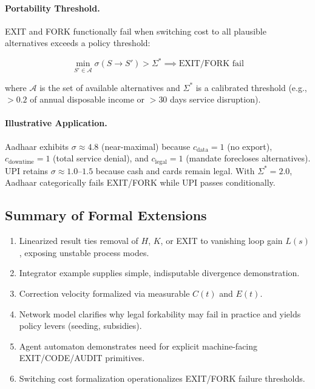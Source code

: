 \documentclass{article}
\begin{document}
\paragraph{Portability Threshold.} EXIT and FORK functionally fail when switching cost to all plausible alternatives exceeds a policy threshold:

\begin{equation}
\min_{S' \in \mathcal{A}} \sigma(S \to S') > \Sigma^* \implies \text{EXIT/FORK fail}
\label{eq:portability-threshold}
\end{equation}

where $\mathcal{A}$ is the set of available alternatives and $\Sigma^*$ is a calibrated threshold (e.g., $>0.2$ of annual disposable income or $>30$ days service disruption).

\paragraph{Illustrative Application.} Aadhaar exhibits $\sigma \approx 4.8$ (near-maximal) because $c_{\text{data}} = 1$ (no export), $c_{\text{downtime}} = 1$ (total service denial), and $c_{\text{legal}} = 1$ (mandate forecloses alternatives). UPI retains $\sigma \approx 1.0$--$1.5$ because cash and cards remain legal. With $\Sigma^* = 2.0$, Aadhaar categorically fails EXIT/FORK while UPI passes conditionally.

\subsection{Summary of Formal Extensions}

\begin{enumerate}
    \item Linearized result ties removal of $H$, $K$, or EXIT to vanishing loop gain $L(s)$, exposing unstable process modes.
    \item Integrator example supplies simple, indisputable divergence demonstration.
    \item Correction velocity formalized via measurable $C(t)$ and $E(t)$.
    \item Network model clarifies why legal forkability may fail in practice and yields policy levers (seeding, subsidies).
    \item Agent automaton demonstrates need for explicit machine-facing EXIT/CODE/AUDIT primitives.
    \item Switching cost formalization operationalizes EXIT/FORK failure thresholds.
\end{enumerate}
\end{document}
